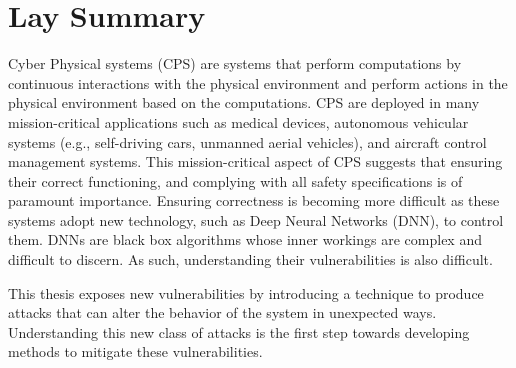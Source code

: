

\chapter{Lay Summary}

Cyber Physical systems (CPS) are systems that perform computations by continuous interactions with the physical environment and perform actions in the physical environment based on the computations. 
\ac{CPS} are deployed in many mission-critical applications such as medical devices, autonomous vehicular systems (e.g., self-driving cars, unmanned aerial vehicles), and aircraft control management systems. 
This mission-critical aspect of \ac{CPS} suggests that ensuring their correct functioning, and complying with all safety specifications is of paramount importance. 
Ensuring correctness is becoming more difficult as these systems adopt new technology, such as Deep Neural Networks (DNN), to control them. 
\ac{DNN}s are black box algorithms whose inner workings are complex and difficult to discern.
As such, understanding their vulnerabilities is also difficult. 

This thesis exposes new vulnerabilities by introducing a  technique to produce attacks that can alter the behavior of the system in unexpected ways. 
Understanding this new class of attacks is the first step towards developing methods to mitigate these vulnerabilities. 



 



